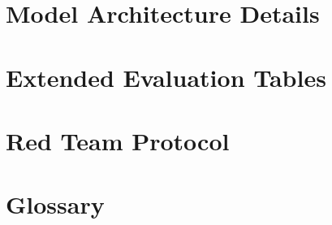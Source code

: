\documentclass[webpdf,contemporary,large]{oup-authoring-template}%
\theoremstyle{thmstyleone}%
\theoremstyle{thmstyletwo}%
\theoremstyle{thmstylethree}%
\begin{document}
\begin{appendices}

\section{Model Architecture Details}
\label{app:models}


\section{Extended Evaluation Tables}
\label{app:tables}


\section{Red Team Protocol}
\label{app:redteam}


\section{Glossary}
\label{app:glossary}


\end{appendices}
\end{document}
